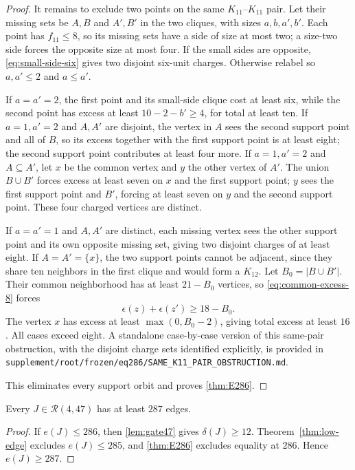 \begin{proof}
It remains to exclude two points on the same $K_{11}$--$K_{11}$ pair. Let their missing sets be $A,B$ and $A',B'$ in the two cliques, with sizes $a,b,a',b'$. Each point has $f_{11}\leq8$, so its missing sets have a side of size at most two; a size-two side forces the opposite size at most four. If the small sides are opposite, \eqref{eq:small-side-six} gives two disjoint six-unit charges. Otherwise relabel so $a,a'\leq2$ and $a\leq a'$.

If $a=a'=2$, the first point and its small-side clique cost at least six, while the second point has excess at least $10-2-b'\geq4$, for total at least ten. If $a=1,a'=2$ and $A,A'$ are disjoint, the vertex in $A$ sees the second support point and all of $B$, so its excess together with the first support point is at least eight; the second support point contributes at least four more. If $a=1,a'=2$ and $A\subseteq A'$, let $x$ be the common vertex and $y$ the other vertex of $A'$. The union $B\cup B'$ forces excess at least seven on $x$ and the first support point; $y$ sees the first support point and $B'$, forcing at least seven on $y$ and the second support point. These four charged vertices are distinct.

If $a=a'=1$ and $A,A'$ are distinct, each missing vertex sees the other support point and its own opposite missing set, giving two disjoint charges of at least eight. If $A=A'=\{x\}$, the two support points cannot be adjacent, since they share ten neighbors in the first clique and would form a $K_{12}$. Let $B_0=|B\cup B'|$. Their common neighborhood has at least $21-B_0$ vertices, so \eqref{eq:common-excess-8} forces
\[
\epsilon(z)+\epsilon(z')\geq18-B_0.
\]
The vertex $x$ has excess at least $\max(0,B_0-2)$, giving total excess at least $16$. All cases exceed eight. A standalone case-by-case version of this same-pair obstruction, with the disjoint charge sets identified explicitly, is provided in \texttt{supplement/root/frozen/eq286/SAME\_K11\_PAIR\_OBSTRUCTION.md}.

This eliminates every support orbit and proves \cref{thm:E286}.
\end{proof}

\begin{corollary}
\label{cor:floor47}
Every $J\in\mathcal R(4,47)$ has at least $287$ edges.
\end{corollary}

\begin{proof}
If $e(J)\leq286$, then \cref{lem:gate47} gives $\delta(J)\geq12$. Theorem~\ref{thm:low-edge} excludes $e(J)\leq285$, and \cref{thm:E286} excludes equality at $286$. Hence $e(J)\geq287$.
\end{proof}

